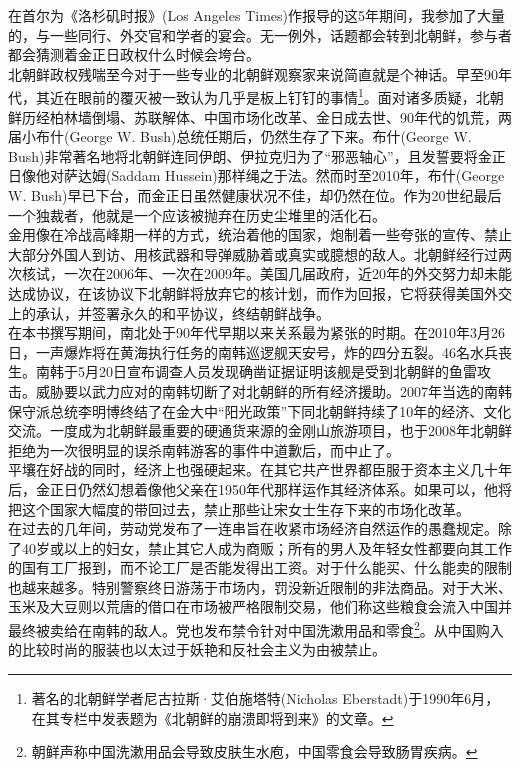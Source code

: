 \ifnum{}
	\begin{multicols}{\theparacolNo}
\fi
在首尔为《洛杉矶时报》(Los Angeles Times)作报导的这5年期间，我参加了大量的，与一些同行、外交官和学者的宴会。无一例外，话题都会转到北朝鲜，参与者都会猜测着金正日政权什么时候会垮台。\\

北朝鲜政权残喘至今对于一些专业的北朝鲜观察家来说简直就是个神话。早至90年代，其近在眼前的覆灭被一致认为几乎是板上钉钉的事情\footnote{著名的北朝鲜学者尼古拉斯·艾伯施塔特(Nicholas Eberstadt)于1990年6月，在其专栏中发表题为《北朝鲜的崩溃即将到来》的文章。}。面对诸多质疑，北朝鲜历经柏林墙倒塌、苏联解体、中国市场化改革、金日成去世、90年代的饥荒，两届小布什(George W. Bush)总统任期后，仍然生存了下来。布什(George W. Bush)非常著名地将北朝鲜连同伊朗、伊拉克归为了“邪恶轴心”，且发誓要将金正日像他对萨达姆(Saddam Hussein)那样绳之于法。然而时至2010年，布什(George W. Bush)早已下台，而金正日虽然健康状况不佳，却仍然在位。作为20世纪最后一个独裁者，他就是一个应该被抛弃在历史尘堆里的活化石。\\

金用像在冷战高峰期一样的方式，统治着他的国家，炮制着一些夸张的宣传、禁止大部分外国人到访、用核武器和导弹威胁着或真实或臆想的敌人。北朝鲜经行过两次核试，一次在2006年、一次在2009年。美国几届政府，近20年的外交努力却未能达成协议，在该协议下北朝鲜将放弃它的核计划，而作为回报，它将获得美国外交上的承认，并签署永久的和平协议，终结朝鲜战争。\\

在本书撰写期间，南北处于90年代早期以来关系最为紧张的时期。在2010年3月26日，一声爆炸将在黄海执行任务的南韩巡逻舰天安号，炸的四分五裂。46名水兵丧生。南韩于5月20日宣布调查人员发现确凿证据证明该舰是受到北朝鲜的鱼雷攻击。威胁要以武力应对的南韩切断了对北朝鲜的所有经济援助。2007年当选的南韩保守派总统李明博终结了在金大中“阳光政策”下同北朝鲜持续了10年的经济、文化交流。一度成为北朝鲜最重要的硬通货来源的金刚山旅游项目，也于2008年北朝鲜拒绝为一次很明显的误杀南韩游客的事件中道歉后，而中止了。\\

平壤在好战的同时，经济上也强硬起来。在其它共产世界都臣服于资本主义几十年后，金正日仍然幻想着像他父亲在1950年代那样运作其经济体系。如果可以，他将把这个国家大幅度的带回过去，禁止那些让宋女士生存下来的市场化改革。\\

在过去的几年间，劳动党发布了一连串旨在收紧市场经济自然运作的愚蠢规定。除了40岁或以上的妇女，禁止其它人成为商贩；所有的男人及年轻女性都要向其工作的国有工厂报到，而不论工厂是否能发得出工资。对于什么能买、什么能卖的限制也越来越多。特别警察终日游荡于市场内，罚没新近限制的非法商品。对于大米、玉米及大豆则以荒唐的借口在市场被严格限制交易，他们称这些粮食会流入中国并最终被卖给在南韩的敌人。党也发布禁令针对中国洗漱用品和零食\footnote{朝鲜声称中国洗漱用品会导致皮肤生水庖，中国零食会导致肠胃疾病。}。从中国购入的比较时尚的服装也以太过于妖艳和反社会主义为由被禁止。\\


\end{multicols}
